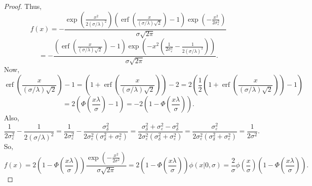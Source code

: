 \documentclass{article}
\newcommand{\ep}{\varepsilon}
\begin{document}
\begin{proof}
	Thus,
	$$f(x) = -\frac{\exp\left(\frac{x^2}{2(\sigma / \lambda)^2}\right)\left(\operatorname{erf}\left(\frac{x}{(\sigma / \lambda) \sqrt{2}}\right) - 1\right)\exp\left(-\frac{x^2}{2\sigma_\ep^2}\right)}{\sigma\sqrt{2\pi}}$$
	$$= -\frac{\left(\operatorname{erf}\left(\frac{x}{(\sigma / \lambda) \sqrt{2}}\right) - 1\right) \exp\left(-x^2\left(\frac{1}{2\sigma_\ep^2} - \frac{1}{2(\sigma / \lambda)^2}\right)\right)}{\sigma\sqrt{2\pi}}.$$
	Now,
	$$\operatorname{erf}\left(\frac{x}{(\sigma / \lambda) \sqrt{2}}\right) - 1 = \left(1 + \operatorname{erf}\left(\frac{x}{(\sigma / \lambda) \sqrt{2}}\right)\right) - 2 = 2\left(\frac{1}{2}\left(1 + \operatorname{erf}\left(\frac{x}{(\sigma / \lambda) \sqrt{2}}\right)\right) - 1\right)$$
	$$= 2\left(\Phi\left(\frac{x\lambda}{\sigma}\right) - 1\right) = -2\left(1 - \Phi\left(\frac{x\lambda}{\sigma}\right)\right).$$
	Also,
	$$\frac{1}{2\sigma_\ep^2} - \frac{1}{2(\sigma / \lambda)^2} = \frac{1}{2\sigma_\ep^2} - \frac{\sigma_\delta^2}{2\sigma_\ep^2(\sigma_\delta^2 + \sigma_\ep^2)} = \frac{\sigma_\delta^2 + \sigma_\ep^2 - \sigma_\delta^2}{2\sigma_\ep^2(\sigma_\delta^2 + \sigma_\ep^2)} = \frac{\sigma_\ep^2}{2\sigma_\ep^2(\sigma_\delta^2 + \sigma_\ep^2)} = \frac{1}{2\sigma^2}.$$
	So,
	$$f(x) = 2\left(1 - \Phi\left(\frac{x\lambda}{\sigma}\right)\right)\frac{\exp\left(-\frac{x^2}{2\sigma^2}\right)}{\sigma\sqrt{2\pi}} = 2\left(1 - \Phi\left(\frac{x\lambda}{\sigma}\right)\right) \phi(x | 0, \sigma) = \frac{2}{\sigma}\phi\left(\frac{x}{\sigma}\right) \left(1 - \Phi\left(\frac{x\lambda}{\sigma}\right)\right).$$
\end{proof}
\end{document}
